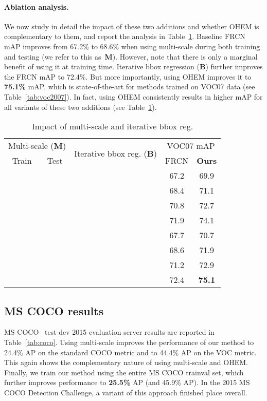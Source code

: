 \documentclass[10pt,twocolumn,letterpaper]{article}
\begin{document}
\vspace{-0.07in}
\paragraph{Ablation analysis.} We now study in detail the impact of these two additions and whether OHEM is complementary to them, and report the analysis in Table~\ref{tab:msms}. Baseline FRCN mAP improves from 67.2\% to 68.6\% when using multi-scale during both training and testing (we refer to this as~\textbf{M}). However, note that there is only a marginal benefit of using it at training time. Iterative bbox regression (\textbf{B}) further improves the FRCN mAP to 72.4\%. But more importantly, using OHEM improves it to \textbf{75.1\%} mAP, which is state-of-the-art for methods trained on VOC07 data (see Table~\ref{tab:voc2007}). In fact, using OHEM consistently results in higher mAP for all variants of these two additions (see Table~\ref{tab:msms}).

\begin{table}[t!]
\centering
\small
\setlength{\tabcolsep}{0.8em}
\caption[caption]{Impact of multi-scale and iterative bbox reg.}
\vspace{-0.1in}
\begin{tabular}{cc c c c}
\toprule
\multicolumn{2}{c}{Multi-scale (\textbf{M})} & \multirow{2}{*}{\parbox{2cm}{\centering Iterative bbox reg. (\textbf{B})}} & \multicolumn{2}{c}{VOC07 mAP} \\\cmidrule{1-2}\cmidrule{4-5}
Train & Test &  & FRCN & \textbf{Ours} \\
\midrule
& & & 67.2 & 69.9\\
&  & & 68.4& 71.1\\
& &  & 70.8& 72.7\\
& &  & 71.9 & 74.1\\
\midrule
& & & 67.7& 70.7\\
&  & & 68.6& 71.9\\
& &  & 71.2& 72.9\\
& &  & 72.4 & \textbf{75.1}\\
\bottomrule
\end{tabular}
\label{tab:msms}
\vspace{-0.13in}
\end{table}

\subsection{MS COCO results}
MS COCO~\cite{coco} test-dev 2015 evaluation server results are reported in Table~\ref{tab:coco}. Using multi-scale improves the performance of our method to 24.4\% AP on the standard COCO metric and to 44.4\% AP on the VOC metric. This again shows the complementary nature of using multi-scale and OHEM. Finally, we train our method using the entire MS COCO trainval set, which further improves performance to \textbf{25.5\%} AP (and 45.9\% AP). In the 2015 MS COCO Detection Challenge, a variant of this approach finished  place overall.
\end{document}
